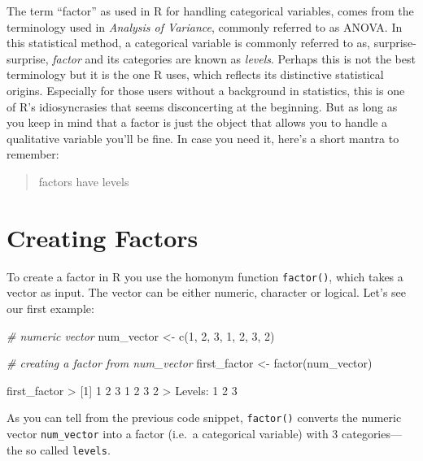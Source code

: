 \documentclass[
]{book}
\newenvironment{Shaded}{\begin{snugshade}}{\end{snugshade}}
\newcommand{\CommentTok}[1]{\textcolor[rgb]{0.56,0.35,0.01}{\textit{#1}}}
\newcommand{\DecValTok}[1]{\textcolor[rgb]{0.00,0.00,0.81}{#1}}
\newcommand{\FunctionTok}[1]{\textcolor[rgb]{0.00,0.00,0.00}{#1}}
\newcommand{\NormalTok}[1]{#1}
\newcommand{\OtherTok}[1]{\textcolor[rgb]{0.56,0.35,0.01}{#1}}
\newcommand{\SpecialCharTok}[1]{\textcolor[rgb]{0.00,0.00,0.00}{#1}}
\begin{document}
The term ``factor'' as used in R for handling categorical variables, comes from
the terminology used in \emph{Analysis of Variance}, commonly referred to as ANOVA.
In this statistical method, a categorical variable is commonly referred to as,
surprise-surprise, \emph{factor} and its categories are known as \emph{levels}. Perhaps
this is not the best terminology but it is the one R uses, which reflects its
distinctive statistical origins. Especially for those users without a background
in statistics, this is one of R's idiosyncrasies that seems disconcerting at
the beginning. But as long as you keep in mind that a factor is just the object
that allows you to handle a qualitative variable you'll be fine. In case you
need it, here's a short mantra to remember:

\begin{quote}
factors have levels
\end{quote}

\hypertarget{creating-factors}{%
\section{Creating Factors}\label{creating-factors}}

To create a factor in R you use the homonym function \texttt{factor()}, which takes a
vector as input. The vector can be either numeric, character or logical. Let's
see our first example:

\begin{Shaded}
\begin{Highlighting}[]
\CommentTok{\# numeric vector}
\NormalTok{num\_vector }\OtherTok{\textless{}{-}} \FunctionTok{c}\NormalTok{(}\DecValTok{1}\NormalTok{, }\DecValTok{2}\NormalTok{, }\DecValTok{3}\NormalTok{, }\DecValTok{1}\NormalTok{, }\DecValTok{2}\NormalTok{, }\DecValTok{3}\NormalTok{, }\DecValTok{2}\NormalTok{)}

\CommentTok{\# creating a factor from num\_vector}
\NormalTok{first\_factor }\OtherTok{\textless{}{-}} \FunctionTok{factor}\NormalTok{(num\_vector)}

\NormalTok{first\_factor}
\SpecialCharTok{\textgreater{}}\NormalTok{ [}\DecValTok{1}\NormalTok{] }\DecValTok{1} \DecValTok{2} \DecValTok{3} \DecValTok{1} \DecValTok{2} \DecValTok{3} \DecValTok{2}
\SpecialCharTok{\textgreater{}}\NormalTok{ Levels}\SpecialCharTok{:} \DecValTok{1} \DecValTok{2} \DecValTok{3}
\end{Highlighting}
\end{Shaded}

As you can tell from the previous code snippet, \texttt{factor()} converts the numeric
vector \texttt{num\_vector} into a factor (i.e.~a categorical variable) with 3
categories---the so called \texttt{levels}.
\end{document}
